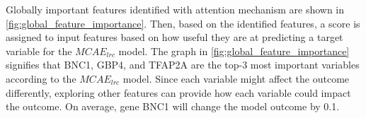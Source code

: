 \hspace*{3.5mm} Globally important features identified with attention mechanism are shown in \cref{fig:global_feature_importance}. Then, based on the identified features, a score is assigned to input features based on how useful they are at predicting a target variable for the $MCAE_{lrc}$ model. The graph in \cref{fig:global_feature_importance} signifies that BNC1, GBP4, and TFAP2A are the top-3 most important variables according to the $MCAE_{lrc}$ model. Since each variable might affect the outcome differently, exploring other features can provide how each variable could impact the outcome. On average, gene BNC1 will change the model outcome by 0.1. 

